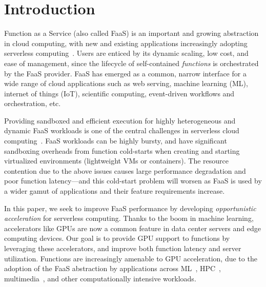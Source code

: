 \section{Introduction}

Function as a Service (also called FaaS) is an important and growing abstraction in cloud computing, with new and existing applications increasingly adopting serverless computing~\cite{wen2023rise}. 
Users are enticed by its dynamic scaling, low cost, and ease of management, since the lifecycle of self-contained \textit{functions} is orchestrated by the FaaS provider.
FaaS has emerged as a common, narrow interface for a wide range of cloud applications such as web serving, machine learning (ML), internet of things (IoT), scientific computing, event-driven workflows and  orchestration, etc.

Providing sandboxed and efficient execution for highly heterogeneous and dynamic FaaS workloads is one of the central challenges in serverless cloud computing~\cite{wang2021faasnet}. 
FaaS workloads can be highly bursty, and have significant sandboxing overheads from function cold-starts when creating and starting virtualized environments (lightweight VMs or containers). 
The resource contention due to the above issues causes large performance degradation and poor function latency---and this cold-start problem will worsen as FaaS is used by a wider gamut of applications and their feature requirements increase. 

In this paper, we seek to improve FaaS performance by developing \emph{opportunistic acceleration} for serverless computing. 
Thanks to the boom in machine learning, accelerators like GPUs are now a common feature in data center servers and edge computing devices. 
Our goal is to provide GPU support to functions by leveraging these accelerators, and improve both function latency and server utilization.
Functions are increasingly amenable to GPU acceleration, due to the adoption of the FaaS abstraction by applications across ML~\cite{carreira2018case,romero2021llama,gimeno2022mlless,xu2021lambdadnn}, HPC~\cite{kumanov2018serverless,hung2019rapid, aytekin2019harnessing,werner2018serverless,shankar2020serverless}, multimedia~\cite{ao2018sprocket, zhang2019video}, and other computationally intensive workloads. 


